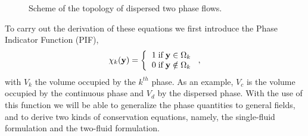 \begin{figure}[h!]
    \centering
    \caption{Scheme of the topology of dispersed two phase flows.}
\end{figure}
To carry out the derivation of these equations we first introduce the Phase Indicator Function (PIF),
\begin{equation}
    \chi_k(\textbf{y}) =  \left\{
      \begin{tabular}{cc}
        $1 \;\text{if} \;\textbf{y} \in \Omega_k$\\
        $0 \;\text{if} \;\textbf{y} \notin \Omega_k$
      \end{tabular}
      \right.,
      \label{eq:phase_indicator}
\end{equation}
with $V_k$ the volume occupied by the $k^{th}$ phase.
As an example, $V_c$ is the volume occupied by the continuous phase and $V_d$ by the dispersed phase.
With the use of this function we will be able to generalize the phase quantities to general fields, and to derive two kinds of conservation equations, namely, the single-fluid formulation and the two-fluid formulation.

